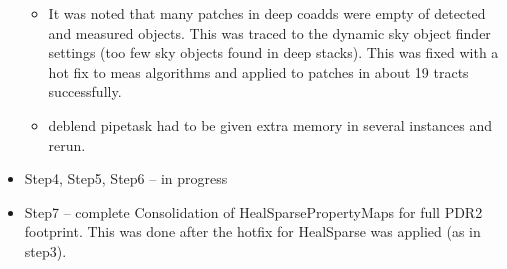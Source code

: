 \begin{itemize}
\begin{itemize}
 \item
	 It was noted that many patches in deep coadds were empty of detected
	and measured objects. This was traced to the dynamic sky object finder
	settings (too few sky objects found in deep stacks).  This
	was fixed with a hot fix to meas algorithms and applied to patches
	in about 19 tracts successfully.

  \item
	 deblend pipetask had to be given extra memory in several instances 
	and rerun.

\end{itemize} %

\item Step4, Step5, Step6 -- in progress

\item Step7 -- complete Consolidation of HealSparsePropertyMaps for full PDR2 footprint.  This was done after the hotfix for HealSparse was applied (as in
	step3).

\end{itemize} %

